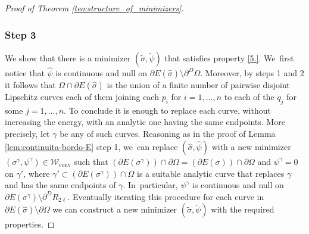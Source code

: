 \documentclass[JEP,XML,SOM,Unicode, NoFloatCountersInSection,published]{cedram}
\let\Om\Omega
\newcommand\admclassconv{{\mathcal W_\mathrm{conv}}}
\theoremstyle{definition}
\begin{document}
\begin{proof}[Proof of Theorem \ref{teo:structure_of_minimizers}]
\subsubsection*{Step 3} We show that there is a minimizer $(\widetilde\sigma,\widetilde\psi)$ that satisfies property \ref{5.}. We~first notice that $\widehat\psi$ is continuous and null on $\partial E(\widehat\sigma)\setminus\partial^D\Om$.
Moreover, by steps 1 and 2 it follows that $\Om\cap \partial E(\widehat\sigma)$ is the union of a finite number of pairwise disjoint Lipschitz curves each of them joining each $p_i$ for $i=1,\dots,n$ to each of the $q_j$ for some $j=1,\dots,n$.
To conclude it is enough to replace each curve, without increasing the energy, with an analytic one having the same endpoints.
More precisely, let $\gamma$ be any of such curves. Reasoning as in the proof of Lemma \ref{lem:continuita-bordo-E} step 1, we~can replace $(\widehat\sigma,\widehat\psi)$ with a new minimizer $(\sigma^\gamma,\psi^\gamma)\in\admclassconv$ such that $(\partial E(\sigma^\gamma))\cap\partial\Om=(\partial E(\sigma))\cap\partial\Om$
and
$\psi^\gamma=0$ on $\gamma'$, where
$\gamma'\subset(\partial E(\sigma^\gamma))\cap\Om$ is a suitable analytic curve that replaces $\gamma$ and has the same endpoints of $\gamma$.
In~particular, $\psi^\gamma$ is continuous and null on $\partial E(\sigma^\gamma)\setminus\partial^DR_{2\ell}$.
Eventually iterating this procedure for each curve in $\partial E(\widehat\sigma)\setminus\partial\Om$ we can construct a new minimizer
$(\widetilde\sigma,\widetilde\psi)$ with the required properties.
\end{proof}
\end{document}
